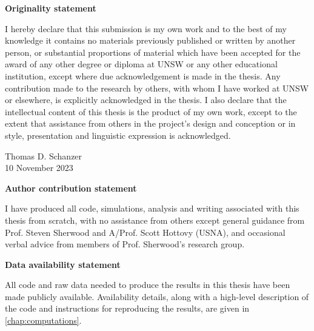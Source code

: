 \documentclass[../main.tex]{subfiles}
\begin{document}
\vspace*{\fill}
\begin{center}
{\textbf{Originality statement}}

\begin{minipage}{0.7\linewidth}
    I hereby declare that this submission is my own work and to the best of
    my knowledge it contains no materials previously published or written by
    another person, or substantial proportions of material which have been
    accepted for the award of any other degree or diploma at UNSW or any
    other educational institution, except where due acknowledgement is made
    in the thesis. Any contribution made to the research by others, with
    whom I have worked at UNSW or elsewhere, is explicitly acknowledged in
    the thesis. I also declare that the intellectual content of this thesis
    is the product of my own work, except to the extent that assistance from
    others in the project's design and conception or in style, presentation
    and linguistic expression is acknowledged.

    \begin{flushright}
        Thomas D. Schanzer \\ 10 November 2023
    \end{flushright}
\end{minipage}
\end{center}
\vspace{1cm}
\begin{center}
{\textbf{Author contribution statement}}

\begin{minipage}{0.7\linewidth}
    I have produced all code, simulations, analysis and writing associated with
    this thesis from scratch, with no assistance from others except general
    guidance from Prof. Steven Sherwood and A/Prof. Scott Hottovy (USNA), and
    occasional verbal advice from members of Prof. Sherwood's research group.
\end{minipage}
\end{center}
\vspace{1cm}
\begin{center}
{\textbf{Data availability statement}}

\begin{minipage}{0.7\linewidth}
    All code and raw data needed to produce the results in this thesis have
    been made publicly available. Availability details, along with a high-level
    description of the code and instructions for reproducing the results,
    are given in \cref{chap:computations}.
\end{minipage}
\end{center}
\vspace{3cm}
\vfill
\end{document}
